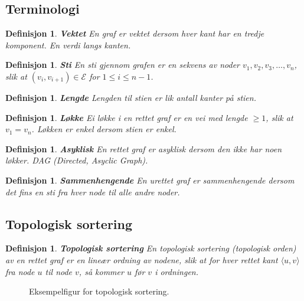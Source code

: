 \documentclass[11pt,a4paper]{article}
\theoremstyle{def}
\newtheorem{definition}[subsection]{Definisjon}
\begin{document}
\subsection{Terminologi}
\begin{definition}
\emph{\textbf{Vektet}} En graf er vektet dersom hver kant har en tredje komponent. En verdi langs kanten.
\end{definition}
\begin{definition}
\emph{\textbf{Sti}} En sti gjennom grafen er en sekvens av noder $v_1, v_2, v_3, \dots, v_n$, slik at $(v_i,v_{i+1}) \in \mathcal{E}$ for $1 \leq i \leq n-1$.
\end{definition}
\begin{definition}
\emph{\textbf{Lengde}} Lengden til stien er lik antall kanter på stien.
\end{definition}
\begin{definition}
\emph{\textbf{Løkke}}  Ei løkke i en rettet graf er en vei med lengde $\geq 1$, slik at $v_1=v_n$. Løkken er \textit{enkel} dersom stien er enkel.
\end{definition}
\begin{definition}
\emph{\textbf{Asyklisk}}  En rettet graf er asyklisk dersom den ikke har noen løkker. DAG (Directed, Asyclic Graph).
\end{definition}
\begin{definition}
\emph{\textbf{Sammenhengende}} En urettet graf er sammenhengende dersom det fins en sti fra hver node til alle andre noder.
\end{definition}

\subsection{Topologisk sortering}
\begin{definition}
\emph{\textbf{Topologisk sortering}} En topologisk sortering (topologisk orden) av en rettet graf er en lineær ordning av nodene, slik at for hver rettet kant $\langle u,v \rangle$ fra node $u$ til node $v$, så kommer $u$ før $v$ i ordningen.
\end{definition}
\begin{figure}[h!]
\centering
{}
\caption{Eksempelfigur for topologisk sortering.}
\label{fig:graph}
\end{figure}
\end{document}
